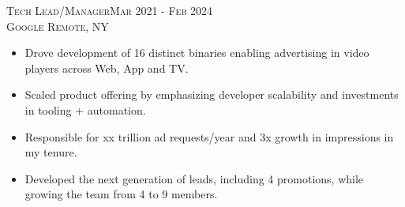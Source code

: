 \textsc{Tech Lead/Manager\hfill Mar 2021 - Feb 2024\\}
\textsc{Google \hfill Remote, NY\\}
\begin{itemize}
	\setlength{\itemsep}{1pt}
	\setlength{\parskip}{0pt}
	\setlength{\parsep}{0pt}
	\setlength{\leftmargin}{-5mm}
  \item Drove development of 16 distinct binaries enabling advertising in video players across Web, App and TV.
  \item Scaled product offering by emphasizing developer scalability and investments in tooling + automation.
  \item Responsible for xx trillion ad requests/year and 3x growth in impressions in my tenure.
  \item Developed the next generation of leads, including 4 promotions, while growing the team from 4 to 9 members.
\end{itemize}

